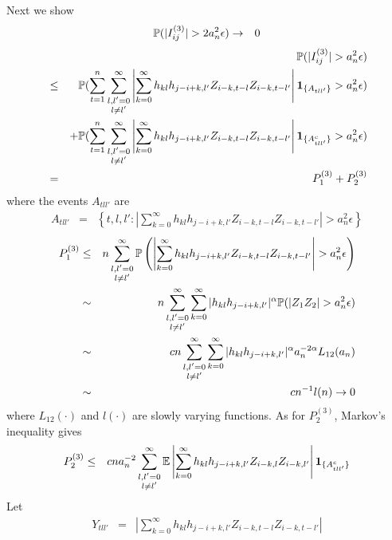 \documentclass{article}
\begin{document}
Next we show
\begin{eqnarray*}
  \P(|I^{(3)}_{ij}| > 2 a_n^2 \epsilon) &\to& 0
\end{eqnarray*}
\begin{eqnarray*}
  && \P(|I^{(3)}_{ij}| > a_n^2 \epsilon) \\
  &\leq& \P(\sum_{t=1}^n \sum_{\substack{l,l'=0 \\ l \neq l'}}^\infty
  \left|\sum_{k=0}^\infty h_{kl}h_{j-i+k,l'} Z_{i-k,t-l}Z_{i-k,t-l'}\right|
  \I{A_{tll'}} > a_n^2 \epsilon ) \\
  && + \P(\sum_{t=1}^n \sum_{\substack{l,l'=0 \\ l \neq l'}}^\infty
  \left|\sum_{k=0}^\infty h_{kl}h_{j-i+k,l'} Z_{i-k,t-l}Z_{i-k,t-l'}\right|
  \I{A^c_{tll'}} > a_n^2 \epsilon ) \\
  &=& P^{(3)}_1 + P^{(3)}_2
\end{eqnarray*}
where the events $A_{tll'}$ are
\begin{eqnarray*}
  A_{tll'} &=& \left\{t,l,l': \left|
      \sum_{k=0}^\infty h_{kl}h_{j-i+k,l'} Z_{i-k,t-l}Z_{i-k,t-l'}
    \right| > a_n^2 \epsilon \right\}
\end{eqnarray*}
\begin{eqnarray*}
  P^{(3)}_1 &\leq& n \sum_{\substack{l,l'=0 \\ l \neq l'}}^\infty \P\left(
    \left|\sum_{k=0}^\infty h_{kl}h_{j-i+k,l'} Z_{i-k,t-l}Z_{i-k,t-l'}\right| > a_n^2 \epsilon
  \right) \\
  &\sim& n \sum_{\substack{l,l'=0 \\ l \neq l'}}^\infty \sum_{k=0}^\infty |h_{kl}h_{j-i+k,l'}|^{\alpha} \P(|Z_1 Z_2| > a_n^2 \epsilon)
  \\
  &\sim& c n \sum_{\substack{l,l'=0 \\ l \neq l'}}^\infty
  \sum_{k=0}^\infty |h_{kl}h_{j-i+k,l'}|^{\alpha} a_n^{-2\alpha} L_{12}(a_n)\\  
  &\sim& c n^{-1} l(n)  \to 0
\end{eqnarray*}
where $L_{12}(\cdot)$ and $l(\cdot)$ are slowly varying functions. As
for $P^{(3)}_2$, Markov's inequality gives
\begin{eqnarray*}
  P^{(3)}_2 &\leq& c n a_n^{-2} \sum_{\substack{l,l'=0 \\ l \neq l'}}^\infty
  \E\left|\sum_{k=0}^\infty h_{kl}h_{j-i+k,l'}
    Z_{i-k,l}Z_{i-k,l'}\right| \I{A^c_{tll'}} \\
\end{eqnarray*}
Let
\begin{eqnarray*}
  Y_{tll'} &=& \left|\sum_{k=0}^\infty h_{kl}h_{j-i+k,l'}
              Z_{i-k,t-l}Z_{i-k,t-l'}\right|
\end{eqnarray*}
\end{document}

